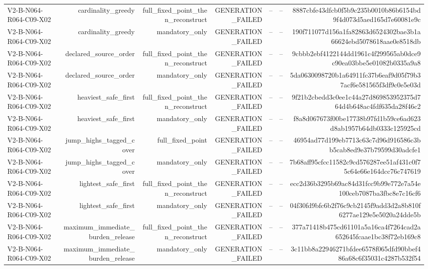 {\begin{longtable}{lrrrrrr}
V2-B-N064-R064-C09-X02 & cardinality\_greedy & full\_fixed\_point\_then\_reconstruct & GENERATION\_FAILED & -- & -- & 8887cbfe43dfcb0f5b9c235b0010b86b6154bd9f4d073d5aed165d7e60081e9c \\
V2-B-N064-R064-C09-X02 & cardinality\_greedy & mandatory\_only & GENERATION\_FAILED & -- & -- & 190f711077d156a1fa82863d6524302bae3b1a66624ebd5078618aae0e8518db \\
V2-B-N064-R064-C09-X02 & declared\_source\_order & full\_fixed\_point\_then\_reconstruct & GENERATION\_FAILED & -- & -- & 9cbbb2ebf4122144dd1961c4f299565ab0dce9c90ea03bbe5e01082b0335a9a8 \\
V2-B-N064-R064-C09-X02 & declared\_source\_order & mandatory\_only & GENERATION\_FAILED & -- & -- & 5da0630098720b1a64911fc37b6eaf9d05f79b37acf6e581565f3df9c0e5e03d \\
V2-B-N064-R064-C09-X02 & heaviest\_safe\_first & full\_fixed\_point\_then\_reconstruct & GENERATION\_FAILED & -- & -- & 9f21b2cbedd3c0ee1c44a27d869853952375d764d4b648ac4fdf635da28f46c2 \\
V2-B-N064-R064-C09-X02 & heaviest\_safe\_first & mandatory\_only & GENERATION\_FAILED & -- & -- & f8a8d067673f00be17738b97fd1b59ce6ad623d8ab1957b64db0333c125925cd \\
V2-B-N064-R064-C09-X02 & jump\_highs\_tagged\_cover & full\_fixed\_point & GENERATION\_FAILED & -- & -- & 46954ad77d199eb7713c63c7d96d916586c3bb5cab8ed9e37b79599d30adcfe1 \\
V2-B-N064-R064-C09-X02 & jump\_highs\_tagged\_cover & mandatory\_only & GENERATION\_FAILED & -- & -- & 7b68aff95cfcc11582c9cd576287ee51af431c0f75c64e66e164dcc76c747619 \\
V2-B-N064-R064-C09-X02 & lightest\_safe\_first & full\_fixed\_point\_then\_reconstruct & GENERATION\_FAILED & -- & -- & ecc2d36b3295b69ac84d31fcc9b99e772e7a54e100ceb7087ba3fbc8e7c16cf6 \\
V2-B-N064-R064-C09-X02 & lightest\_safe\_first & mandatory\_only & GENERATION\_FAILED & -- & -- & 04f30fd9bfc6b2f76c9cb2145f9add3d2a8b810f6277ae129e5e5020a24dde5b \\
V2-B-N064-R064-C09-X02 & maximum\_immediate\_burden\_release & full\_fixed\_point\_then\_reconstruct & GENERATION\_FAILED & -- & -- & 377a71418b475cd61101a5a16ca4f7264cad2a652645fcaae1bc38f72eb169c8 \\
V2-B-N064-R064-C09-X02 & maximum\_immediate\_burden\_release & mandatory\_only & GENERATION\_FAILED & -- & -- & 3c11bb8a22946271bfdee6578f065dfd90bbef486a68c6f35031c4287b532f54 \\

\end{longtable}}
